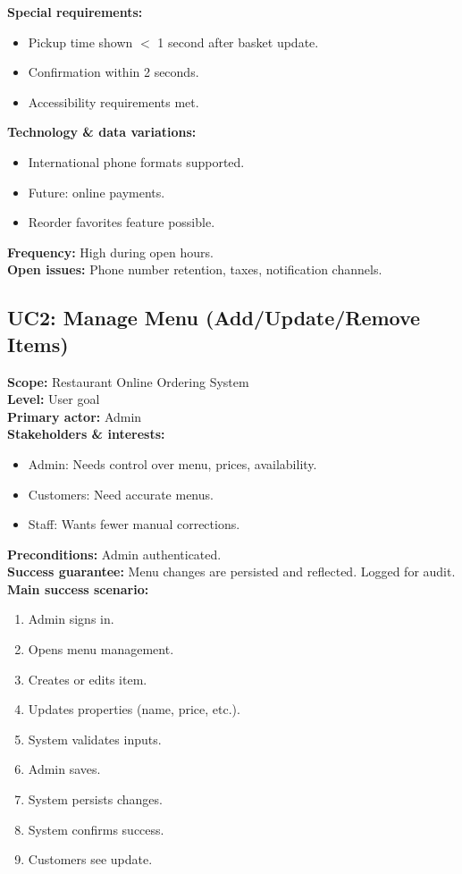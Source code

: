 \documentclass{article}
\begin{document}
\textbf{Special requirements:}
\begin{itemize}
    \item Pickup time shown $<$ 1 second after basket update.
    \item Confirmation within 2 seconds.
    \item Accessibility requirements met.
\end{itemize}

\textbf{Technology \& data variations:}
\begin{itemize}
    \item International phone formats supported.
    \item Future: online payments.
    \item Reorder favorites feature possible.
\end{itemize}

\textbf{Frequency:} High during open hours.\\
\textbf{Open issues:} Phone number retention, taxes, notification channels.

\subsection*{UC2: Manage Menu (Add/Update/Remove Items)}
\textbf{Scope:} Restaurant Online Ordering System \\
\textbf{Level:} User goal \\
\textbf{Primary actor:} Admin \\

\textbf{Stakeholders \& interests:}
\begin{itemize}
    \item Admin: Needs control over menu, prices, availability.
    \item Customers: Need accurate menus.
    \item Staff: Wants fewer manual corrections.
\end{itemize}

\textbf{Preconditions:} Admin authenticated.\\
\textbf{Success guarantee:} Menu changes are persisted and reflected. Logged for audit.\\

\textbf{Main success scenario:}
\begin{enumerate}
    \item Admin signs in.
    \item Opens menu management.
    \item Creates or edits item.
    \item Updates properties (name, price, etc.).
    \item System validates inputs.
    \item Admin saves.
    \item System persists changes.
    \item System confirms success.
    \item Customers see update.
\end{enumerate}
\end{document}
